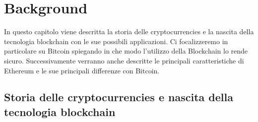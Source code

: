 \documentclass[12pt]{report}
\begin{document}
\chapter{Background}

In questo capitolo viene descritta la storia delle cryptocurrencies e la nascita della tecnologia blockchain con le sue possibili applicazioni.
Ci focalizzeremo in particolare su Bitcoin spiegando in che modo l'utilizzo della Blockchain lo rende sicuro. 
Successivamente verranno anche descritte le principali caratteristiche di Ethereum e le sue principali differenze con Bitcoin.

\section{Storia delle cryptocurrencies e nascita della tecnologia blockchain}
\end{document}
